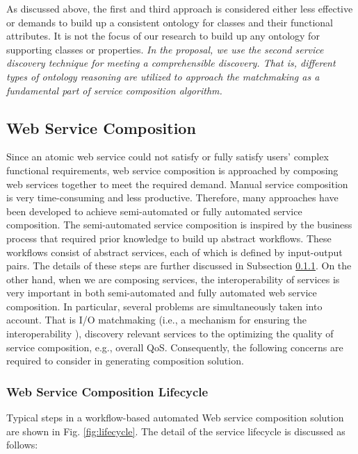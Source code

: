 As discussed above, the first and third approach is considered either less effective or demands to build up a consistent ontology for classes and their functional attributes. It is not the focus of our research to build up any ontology for supporting classes or properties.  \emph{In the proposal, we use the second service discovery technique for meeting a comprehensible discovery. That is, different types of ontology reasoning are utilized to approach the matchmaking as a fundamental part of service composition algorithm.}



\subsection{Web Service Composition}\label{servicecomposition}

Since an atomic web service could not satisfy or fully satisfy users' complex functional requirements, web service composition is approached by composing web services together to meet the required demand. Manual service composition is very time-consuming and less productive. Therefore, many approaches have been developed to achieve semi-automated or fully automated service composition. The semi-automated service composition is inspired by the business process that required prior knowledge to build up abstract workflows. These workflows consist of abstract services, each of which is defined by input-output pairs. The details of these steps are further discussed in Subsection \ref{lifecycle}. On the other hand, when we are composing services, the interoperability of services is very important in both semi-automated and fully automated web service composition. In particular, several problems are simultaneously taken into account. That is I/O matchmaking (i.e., a mechanism for ensuring the interoperability ), discovery relevant services to the optimizing the quality of service composition, e.g., overall QoS. Consequently, the following concerns are required to consider in generating composition solution. 


\subsubsection{Web Service Composition Lifecycle}\label{lifecycle}
Typical steps in a workflow-based automated Web service composition solution are shown in Fig. \ref{fig:lifecycle}. The detail of the service lifecycle is discussed as follows:

